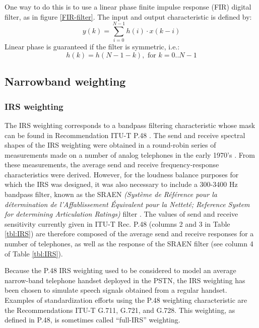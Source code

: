 One way to do this is to use a linear phase finite impulse
response (FIR) digital filter, as in figure \ref{FIR-filter}. The
input and output characteristic is defined by:
\[
      y(k) = \sum_{i=0}^{N-1} h(i) \cdot x(k-i)
\]
Linear phase is guaranteed if the filter is symmetric, i.e.:
\[
     h(k)=h(N-1-k), \mbox{ for } k=0..N-1
\]

\subsection{Narrowband weighting}

\subsubsection{IRS weighting}

The IRS weighting corresponds to a bandpass filtering characteristic
whose mask can be found in Recommendation ITU-T P.48 \cite{P.48}.
The send and receive spectral shapes of the IRS weighting were
obtained in a round-robin series of measurements made on a number of
analog telephones in the early 1970's
\cite{BNR-ModIRS}. From these measurements, the average send and
receive frequency-response characteristics were derived. However,
for the loudness balance purposes for which the IRS was designed, it
was also necessary to include a 300-3400 Hz bandpass filter, known
as the SRAEN {\em (Syst\`{e}me de R\'{e}f\'{e}rence pour la
d\'{e}termination de l'Affablissement \'{E}quivalent pour la
Nettet\'{e}; Reference System for determining Articulation Ratings)}
filter \cite{P.11, G.111}. The values of send and receive sensitivity
currently given in ITU-T Rec. P.48 (columns 2 and 3 in Table
\ref{tbl:IRS}) are therefore composed of the average send and
receive responses for a number of telephones, as well as the
response of the SRAEN filter (see column 4 of Table \ref{tbl:IRS}).

Because the P.48 IRS weighting used to be considered to model an
average narrow-band telephone handset deployed in the PSTN, the IRS
weighting has been chosen to simulate speech signals obtained from a
regular handset. Examples of standardization efforts using the P.48
weighting characteristic are the Recommendations ITU-T G.711,
G.721, and G.728. This weighting, as defined in P.48, is sometimes
called ``full-IRS'' weighting.

